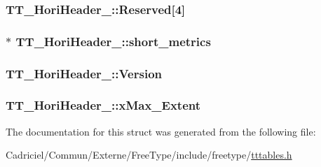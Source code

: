 \hypertarget{struct_t_t___hori_header___af2a2b374d8f81771fb75d3bdc96bcbf7}{
\subsubsection[{Reserved}]{ T\-T\-\_\-\-Hori\-Header\-\_\-\-::\-Reserved\mbox{[}4\mbox{]}}}\label{struct_t_t___hori_header___af2a2b374d8f81771fb75d3bdc96bcbf7}
\hypertarget{struct_t_t___hori_header___ae39107c4cfc3e7c1871dbb304bbe4a5a}{
\subsubsection[{short\-\_\-metrics}]{$\ast$ T\-T\-\_\-\-Hori\-Header\-\_\-\-::short\-\_\-metrics}}\label{struct_t_t___hori_header___ae39107c4cfc3e7c1871dbb304bbe4a5a}
\hypertarget{struct_t_t___hori_header___a2d0967448b63db392e35b566196fef97}{
\subsubsection[{Version}]{ T\-T\-\_\-\-Hori\-Header\-\_\-\-::\-Version}}\label{struct_t_t___hori_header___a2d0967448b63db392e35b566196fef97}
\hypertarget{struct_t_t___hori_header___ab483cb323f9adc9d959209a42eb19957}{
\subsubsection[{x\-Max\-\_\-\-Extent}]{ T\-T\-\_\-\-Hori\-Header\-\_\-\-::x\-Max\-\_\-\-Extent}}\label{struct_t_t___hori_header___ab483cb323f9adc9d959209a42eb19957}


The documentation for this struct was generated from the following file\-:\begin{DoxyCompactItemize}
\item 
Cadriciel/\-Commun/\-Externe/\-Free\-Type/include/freetype/\hyperlink{tttables_8h}{tttables.\-h}\end{DoxyCompactItemize}
